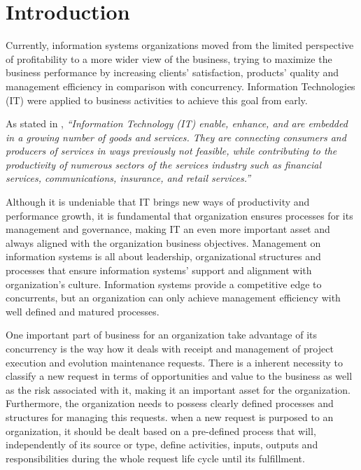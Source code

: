 
% 
% 

\section{Introduction}


Currently, information systems organizations moved from the limited perspective of profitability to a more wider view of the business, trying to maximize the business performance by increasing clients' satisfaction, products' quality and management efficiency in comparison with concurrency. Information Technologies (IT) were applied to business activities to achieve this goal from early.\par 
As stated in \cite{itilSS}, \textit{``Information Technology (IT) enable, enhance, and are embedded in a growing number of goods and services. They are connecting consumers and producers of services in ways previously not feasible, while contributing to the productivity of numerous sectors of the services industry such as financial services, communications, insurance, and retail services.''}\par
Although it is undeniable that IT brings new ways of productivity and performance growth, it is fundamental that organization ensures processes for its management and governance, making IT an even more important asset and always aligned with the organization business objectives. Management on information systems is all about leadership, organizational structures and processes that ensure information systems' support and alignment with organization's culture. Information systems provide a competitive edge to concurrents, but an organization can only achieve management efficiency with well defined and matured processes.\par
One important part of business for an organization take advantage of its concurrency is the way how it deals with receipt and management of project execution and evolution maintenance requests. There is a inherent necessity to classify a new request in terms of opportunities  and value to the business as well as the risk associated with it, making it an important asset for the organization. Furthermore, the organization needs to possess clearly defined processes and structures for managing this requests. when a new request is purposed to an organization, it should be dealt based on a pre-defined process that will, independently of its source or type, define activities, inputs, outputs and responsibilities during the whole request life cycle until its fulfillment. \par
